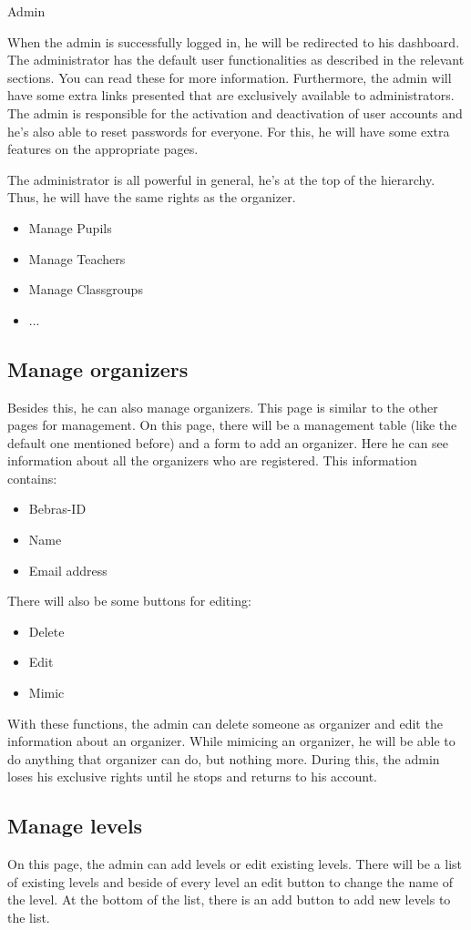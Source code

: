 \begin{section}{Admin}

When the admin is successfully logged in, he will be redirected to his dashboard. The administrator has the default user functionalities as described in the relevant sections. You can read these for more information. Furthermore, the admin will have some extra links presented that are exclusively available to administrators. \\
The admin is responsible for the activation and deactivation of user accounts and he's also able to reset passwords for everyone. For this, he will have some extra features on the appropriate pages.

The administrator is all powerful in general, he's at the top of the hierarchy. Thus, he will have the same rights as the organizer.
\begin{itemize}
\item Manage Pupils
\item Manage Teachers
\item Manage Classgroups
\item ...
\end{itemize}

\subsection{Manage organizers}
Besides this, he can also manage organizers. This page is similar to the other pages for management. On this page, there will be a management table (like the default one mentioned before) and a form to add an organizer. Here he can see information about all the organizers who are registered. This information contains:
\begin{itemize}
\item Bebras-ID
\item Name
\item Email address
\end{itemize}

There will also be some buttons for editing:
\begin{itemize}
\item Delete
\item Edit
\item Mimic
\end{itemize}

With these functions, the admin can delete someone as organizer and edit the information about an organizer. While mimicing an organizer, he will be able to do anything that organizer can do, but nothing more. During this, the admin loses his exclusive rights until he stops and returns to his account.

\subsection{Manage levels}
On this page, the admin can add levels or edit existing levels. There will be a list of existing levels and beside of every level an edit button to change the name of the level. At the bottom of the list, there is an add button to add new levels to the list.   

\end{section}
